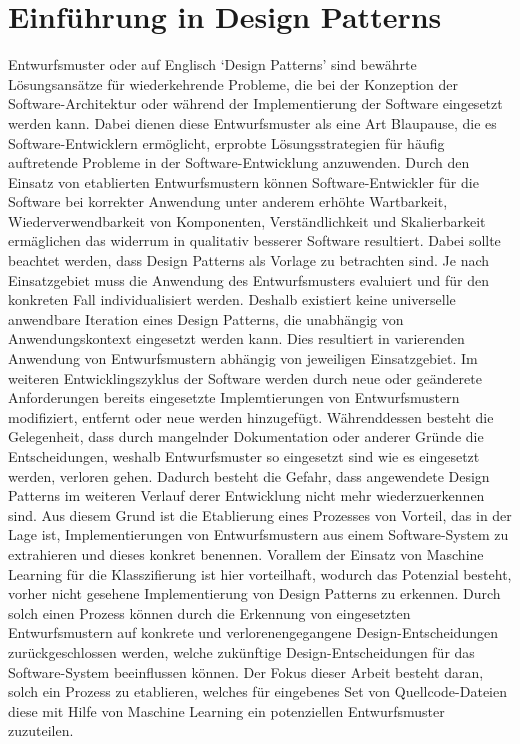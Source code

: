 \section{Einführung in Design Patterns}

Entwurfsmuster oder auf Englisch `Design Patterns' sind bewährte Lösungsansätze für wiederkehrende Probleme, die bei der Konzeption der Software-Architektur oder während der Implementierung der Software
eingesetzt werden kann. Dabei dienen diese Entwurfsmuster als eine Art Blaupause, die es Software-Entwicklern ermöglicht, erprobte Lösungsstrategien für häufig auftretende Probleme in der Software-Entwicklung anzuwenden.
Durch den Einsatz von etablierten Entwurfsmustern können Software-Entwickler für die Software bei korrekter Anwendung unter anderem erhöhte Wartbarkeit, Wiederverwendbarkeit von Komponenten, Verständlichkeit und Skalierbarkeit ermäglichen das widerrum in qualitativ besserer Software resultiert.
Dabei sollte beachtet werden, dass Design Patterns als Vorlage zu betrachten sind. Je nach Einsatzgebiet muss die Anwendung des Entwurfsmusters evaluiert und für den konkreten Fall individualisiert werden.
Deshalb existiert keine universelle anwendbare Iteration eines Design Patterns, die unabhängig von Anwendungskontext eingesetzt werden kann. Dies resultiert in varierenden Anwendung von Entwurfsmustern abhängig von jeweiligen Einsatzgebiet.
Im weiteren Entwicklingszyklus der Software werden durch neue oder geänderete Anforderungen bereits eingesetzte Implemtierungen von Entwurfsmustern modifiziert, entfernt oder neue werden hinzugefügt.
Währenddessen besteht die Gelegenheit, dass durch mangelnder Dokumentation oder anderer Gründe die Entscheidungen, weshalb Entwurfsmuster so eingesetzt sind wie es eingesetzt werden, verloren gehen.
Dadurch besteht die Gefahr, dass angewendete Design Patterns im weiteren Verlauf derer Entwicklung nicht mehr wiederzuerkennen sind. Aus diesem Grund ist die Etablierung eines Prozesses von Vorteil, das in der Lage ist,
Implementierungen von Entwurfsmustern aus einem Software-System zu extrahieren und dieses konkret benennen. Vorallem der Einsatz von Maschine Learning für die Klasszifierung ist hier vorteilhaft, wodurch das Potenzial besteht, vorher nicht gesehene Implementierung von Design Patterns zu erkennen.
Durch solch einen Prozess können durch die Erkennung von eingesetzten Entwurfsmustern auf konkrete und verlorenengegangene Design-Entscheidungen zurückgeschlossen werden, welche zukünftige Design-Entscheidungen für das Software-System beeinflussen können. 
Der Fokus dieser Arbeit besteht daran, solch ein Prozess zu etablieren, welches für eingebenes Set von Quellcode-Dateien diese mit Hilfe von Maschine Learning ein potenziellen Entwurfsmuster zuzuteilen.  


